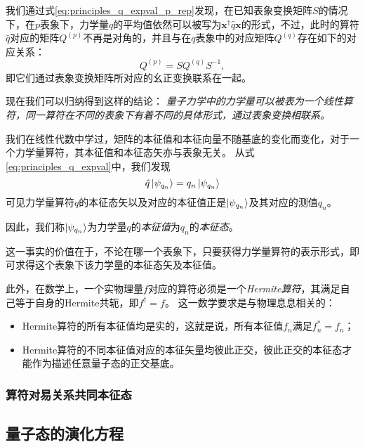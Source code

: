 我们通过式\eqref{eq:principles_q_expval_p_rep}发现，在已知表象变换矩阵$S$的情况下，在$p$表象下，力学量$q$的平均值依然可以被写为$\bm{x}^\dag \hat{q}\bm{x}$的形式，不过，此时的算符$\hat{q}$对应的矩阵$Q^{(p)}$不再是对角的，并且与在$q$表象中的对应矩阵$Q^{(q)}$存在如下的对应关系：
\begin{equation}
    Q^{(p)} = S Q^{(q)} S^{-1},
\end{equation}
即它们通过表象变换矩阵所对应的幺正变换联系在一起。

现在我们可以归纳得到这样的结论：
\emph{量子力学中的力学量可以被表为一个线性算符，同一算符在不同的表象下有着不同的具体形式，通过表象变换相联系。}

我们在线性代数中学过，矩阵的本征值和本征向量不随基底的变化而变化，对于一个力学量算符，其本征值和本征态矢亦与表象无关。
从式\eqref{eq:principles_q_expval}中，我们发现
\begin{equation}
    \hat{q} \ket{\psi_{q_n}} = q_n \ket{\psi_{q_n}}
\end{equation}
可见力学量算符$q$的本征态矢以及对应的本征值正是$\ket{\psi_{q_n}}$及其对应的测值$q_n$。
\begin{tcolorbox}
因此，我们称$\ket{\psi_{q_n}}$为力学量$q$的\emph{本征值}为$q_n$的\emph{本征态}。
\end{tcolorbox}
这一事实的价值在于，不论在哪一个表象下，只要获得力学量算符的表示形式，即可求得这个表象下该力学量的本征态矢及本征值。

此外，在数学上，一个实物理量$f$对应的算符必须是一个\emph{Hermite算符}，其满足自己等于自身的Hermite共轭，即$f^\dag=f$。
这一数学要求是与物理息息相关的：
\begin{itemize}
    \item{Hermite算符的所有本征值均是实的，这就是说，所有本征值$f_n$满足$f_n^*=f_n$；}
    \item{Hermite算符的不同本征值对应的本征矢量均彼此正交，彼此正交的本征态才能作为描述任意量子态的正交基底。}
\end{itemize}


\subsubsection{\texorpdfstring{算符对易关系\quad 共同本征态}{算符对易关系  共同本征态}}




\subsection{\texorpdfstring{量子态的演化\quad \schrodinger 方程}{量子态的演化  \schrodinger 方程}}
\label{subsec:principles_quantum_state_evolution}

